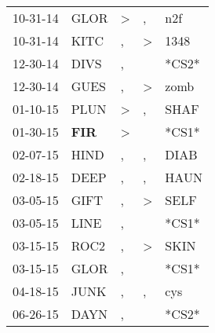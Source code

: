 \begin{supertabular}{p{0.07\textwidth}p{0.06\textwidth}p{0.02\textwidth}p{0.02\textwidth}p{0.06\textwidth}}
          10-31-14\textsuperscript{} &           GLOR\textsuperscript{} &     \textgreater &                , &            n2f\textsuperscript{} \\
          10-31-14\textsuperscript{} &           KITC\textsuperscript{} &                , &     \textgreater &           1348\textsuperscript{} \\
          12-30-14\textsuperscript{} &           DIVS\textsuperscript{} &                , &                  &                            *CS2* \\
          12-30-14\textsuperscript{} &           GUES\textsuperscript{} &                , &     \textgreater &           zomb\textsuperscript{} \\
          01-10-15\textsuperscript{} &           PLUN\textsuperscript{} &     \textgreater &                , &           SHAF\textsuperscript{} \\
          01-30-15\textsuperscript{} &   \textbf{FIR\textsuperscript{}} &     \textgreater &                  &                            *CS1* \\
          02-07-15\textsuperscript{} &           HIND\textsuperscript{} &                , &                , &           DIAB\textsuperscript{} \\
          02-18-15\textsuperscript{} &           DEEP\textsuperscript{} &                , &                , &           HAUN\textsuperscript{} \\
          03-05-15\textsuperscript{} &           GIFT\textsuperscript{} &                , &     \textgreater &           SELF\textsuperscript{} \\
          03-05-15\textsuperscript{} &           LINE\textsuperscript{} &                , &                  &                            *CS1* \\
          03-15-15\textsuperscript{} &           ROC2\textsuperscript{} &                , &     \textgreater &           SKIN\textsuperscript{} \\
          03-15-15\textsuperscript{} &           GLOR\textsuperscript{} &                , &                  &                            *CS1* \\
          04-18-15\textsuperscript{} &           JUNK\textsuperscript{} &                , &                , &            cys\textsuperscript{} \\
          06-26-15\textsuperscript{} &           DAYN\textsuperscript{} &                , &                  &                            *CS2* \\

\end{supertabular}
